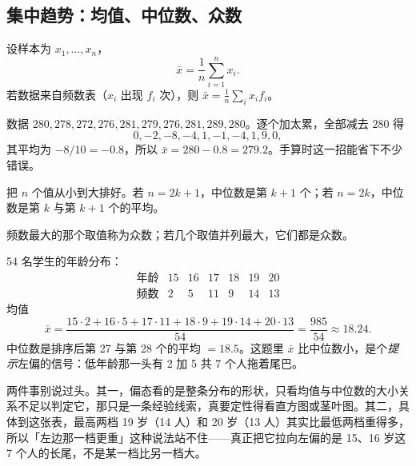 \subsection{集中趋势：均值、中位数、众数}

\begin{definition}[样本均值]
设样本为 $x_1,\dots,x_n$，
\[
\bar x=\frac1n\sum_{i=1}^{n}x_i .
\]
若数据来自频数表（$x_i$ 出现 $f_i$ 次），则 $\bar x=\frac1n\sum_i x_i f_i$。
\end{definition}

\begin{example}[先减掉一个基准数]
数据 $280,278,272,276,281,279,276,281,289,280$。逐个加太累，全部减去 $280$ 得
\[
0,-2,-8,-4,1,-1,-4,1,9,0,
\]
其平均为 $-8/10=-0.8$，所以 $\bar x=280-0.8=279.2$。手算时这一招能省下不少错误。
\end{example}

\begin{definition}[样本中位数]
把 $n$ 个值从小到大排好。若 $n=2k+1$，中位数是第 $k+1$ 个；若 $n=2k$，中位数是第 $k$ 与第 $k+1$ 个的平均。
\end{definition}

\begin{definition}[样本众数]
频数最大的那个取值称为众数；若几个取值并列最大，它们都是众数。
\end{definition}

\begin{example}[三个数一起算]
54 名学生的年龄分布：
\[
\begin{array}{c|cccccc}
\text{年龄} & 15 & 16 & 17 & 18 & 19 & 20\\ \hline
\text{频数} & 2 & 5 & 11 & 9 & 14 & 13
\end{array}
\]
均值
\[
\bar x=\frac{15\cdot2+16\cdot5+17\cdot11+18\cdot9+19\cdot14+20\cdot13}{54}=\frac{985}{54}\approx 18.24 .
\]
中位数是排序后第 27 与第 28 个的平均 $=18.5$。这题里 $\bar x$ 比中位数小，是个\emph{提示}左偏的信号：低年龄那一头有 2 加 5 共 7 个人拖着尾巴。
\end{example}

\begin{remark}[这句「左偏」说到哪儿为止]
两件事别说过头。其一，偏态看的是整条分布的形状，只看均值与中位数的大小关系不足以判定它，那只是一条经验线索，真要定性得看直方图或茎叶图。其二，具体到这张表，最高两档 19 岁（14 人）和 20 岁（13 人）其实比最低两档重得多，所以「左边那一档更重」这种说法站不住——真正把它拉向左偏的是 15、16 岁这 7 个人的长尾，不是某一档比另一档大。
\end{remark}

